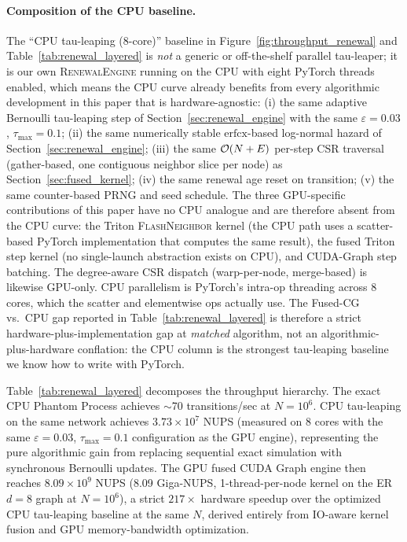 \paragraph{Composition of the CPU baseline.}
The ``CPU tau-leaping (8-core)'' baseline in Figure~\ref{fig:throughput_renewal} and Table~\ref{tab:renewal_layered} is \emph{not} a generic or off-the-shelf parallel tau-leaper; it is our own \textsc{RenewalEngine} running on the CPU with eight PyTorch threads enabled, which means the CPU curve already benefits from every algorithmic development in this paper that is hardware-agnostic:
(i) the same adaptive Bernoulli tau-leaping step of Section~\ref{sec:renewal_engine} with the same $\varepsilon = 0.03$, $\tau_{\max} = 0.1$;
(ii) the same numerically stable $\mathrm{erfcx}$-based log-normal hazard of Section~\ref{sec:renewal_engine};
(iii) the same $\mathcal{O}(N+E)$ per-step CSR traversal (gather-based, one contiguous neighbor slice per node) as Section~\ref{sec:fused_kernel};
(iv) the same renewal age reset on transition;
(v) the same counter-based PRNG and seed schedule.
The three GPU-specific contributions of this paper have no CPU analogue and are therefore absent from the CPU curve: the Triton \textsc{FlashNeighbor} kernel (the CPU path uses a scatter-based PyTorch implementation that computes the same result), the fused Triton step kernel (no single-launch abstraction exists on CPU), and CUDA-Graph step batching. The degree-aware CSR dispatch (warp-per-node, merge-based) is likewise GPU-only. CPU parallelism is PyTorch's intra-op threading across 8 cores, which the scatter and elementwise ops actually use. The Fused-CG vs.\ CPU gap reported in Table~\ref{tab:renewal_layered} is therefore a strict hardware-plus-implementation gap at \emph{matched} algorithm, not an algorithmic-plus-hardware conflation: the CPU column is the strongest tau-leaping baseline we know how to write with PyTorch.

Table~\ref{tab:renewal_layered} decomposes the throughput hierarchy. The exact CPU Phantom Process achieves $\sim$70 transitions/sec at $N = 10^6$. CPU tau-leaping on the same network achieves $3.73 \times 10^7$ NUPS (measured on 8 cores with the same $\varepsilon = 0.03$, $\tau_{\max}=0.1$ configuration as the GPU engine), representing the pure algorithmic gain from replacing sequential exact simulation with synchronous Bernoulli updates. The GPU fused CUDA Graph engine then reaches $8.09 \times 10^9$ NUPS (8.09 Giga-NUPS, 1-thread-per-node kernel on the ER $d{=}8$ graph at $N = 10^6$), a strict $217\times$ hardware speedup over the optimized CPU tau-leaping baseline at the same $N$, derived entirely from IO-aware kernel fusion and GPU memory-bandwidth optimization.

